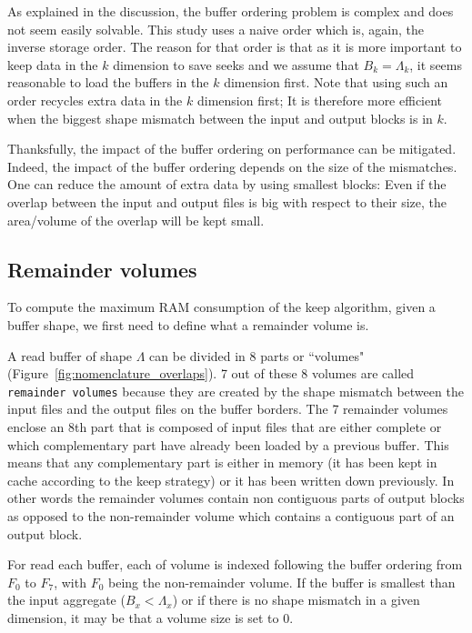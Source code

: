 \documentclass[sigconf, nonacm]{acmart}
\begin{document}
{As explained in the discussion, the buffer ordering problem is complex and does
not seem easily solvable.
This study uses a naive order which is, again, the inverse storage order.
The reason for that order is that as it is more important to keep data in the
$k$ dimension to save seeks and we assume that $B_k=\Lambda_k$, it seems
reasonable to load the buffers in the $k$ dimension first.
Note that using such
an order recycles extra data in the $k$ dimension first; It is therefore
more efficient when the biggest shape mismatch between the input and output
blocks is in $k$.

Thanksfully, the impact of the buffer ordering on performance can be
mitigated. Indeed, the impact of the buffer ordering depends on the size of the
mismatches. One can reduce the amount of extra data by using smallest blocks: Even
if the overlap between the input and output files is big with respect to their
size, the area/volume of the overlap will be kept small.

\subsection{Remainder volumes}
To compute the maximum RAM consumption of the keep algorithm, given a
buffer shape, we first need to define what a remainder volume is.

A read buffer of shape $\Lambda$ can be divided in
8 parts or ``volumes" (Figure~\ref{fig:nomenclature_overlaps}).
7 out of these 8 volumes are called \texttt{remainder volumes} because
they are created by the shape mismatch between the input files and the output files on
the buffer borders.
The 7 remainder volumes enclose an 8th part that is composed of
input files that are either complete or which complementary part have already
been loaded by a previous buffer. This means that any complementary part is either
in memory (it has been kept in cache according to the keep strategy) or it has
been written down previously.
In other words the remainder volumes contain non contiguous parts of output blocks
as opposed to the non-remainder volume which contains a contiguous part of
an output block.

For read each buffer, each of volume
is indexed following the buffer ordering from $F_0$ to $F_7$, with $F_0$ being the
non-remainder volume. If the buffer is smallest than the input aggregate
($B_x<\Lambda_x$) or if there is no shape mismatch in a given dimension,
it may be that a volume size is set to 0.

}
\end{document}
